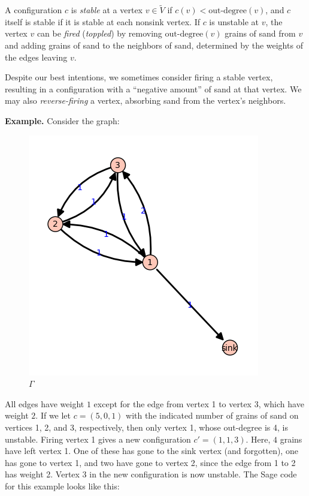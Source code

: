 \documentclass[letterpaper,10pt,english]{manual}
\begin{document}
A configuration $c$ is \emph{stable} at a vertex $v\in\tilde{V}$ if
$c(v)<\mbox{out-degree}(v)$, and $c$ itself is stable if it is stable at each
nonsink vertex.  If $c$ is unstable at $v$, the vertex $v$ can be \emph{fired}
(\emph{toppled}) by removing $\mbox{out-degree}(v)$ grains of sand from $v$ and
adding grains of sand to the neighbors of sand, determined by the weights of
the edges leaving $v$.

Despite our best intentions, we sometimes consider firing a stable vertex,
resulting in a configuration with a ``negative amount'' of sand at that vertex.
We may also \emph{reverse-firing} a vertex, absorbing sand from the vertex's
neighbors.

\textbf{Example.} Consider the graph:
\begin{figure}[htbp]
\centering

\includegraphics{example1.png}
\caption{$\Gamma$}\end{figure}

All edges have weight $1$ except for the edge from vertex 1 to vertex 3,
which have weight $2$.  If we let $c=(5,0,1)$ with the indicated number of
grains of sand on vertices 1, 2, and 3, respectively, then only vertex 1,
whose out-degree is 4, is unstable.  Firing vertex 1 gives a new
configuration $c'=(1,1,3)$.  Here, $4$ grains have left vertex 1.  One of
these has gone to the sink vertex (and forgotten), one has gone to vertex 1,
and two have gone to vertex 2, since the edge from 1 to 2 has weight 2.
Vertex 3 in the new configuration is now unstable.  The Sage code for this
example looks like this:
\end{document}
